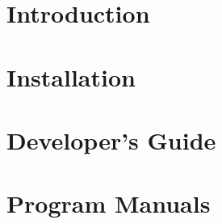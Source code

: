  \chapter{Introduction} 
    
    

  \chapter{Installation} \label{INSTALL} 
    

  \chapter{Developer's Guide} \label{DEVELOPERS-GUIDE} 
    
     
     
     
    
    
    
    
    
    
    
    
    
    


  \chapter{Program Manuals} \label{PROGRAM MANUALS} 
    
    
    
    
    
    
    
    
    
    
    
    
    
    



  \appendix